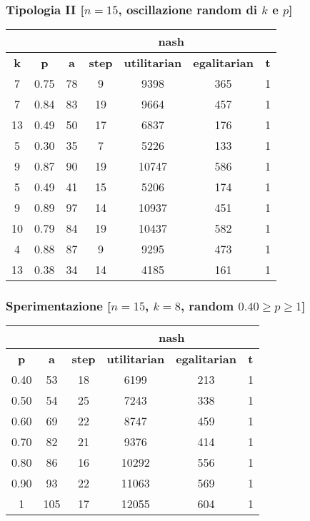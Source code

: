 \documentclass{beamer}
\begin{document}
\begin{frame}
\frametitle{Tipologia II [$n=15$, oscillazione random di $k$ e $p$]}
\begin{table}[H]
\centering
\scalebox{1} {
\begin{tabular}{|c|c|c|c|c|c|c|}
\hline
\multicolumn{3}{|c|}{\textbf{}} & \multicolumn{3}{c|}{\textbf{\color{orange}nash}} & \textbf{} \\ \hline
\textbf{\alert{k}} & \textbf{\alert{p}} & \textbf{a} & \textbf{step} & \textbf{utilitarian} & \textbf{egalitarian} & \textbf{t} \\ \hline
7 & 0.75 & 78 & 9 & 9398 & 365 & 1 \\ \hline
7 & 0.84 & 83 & 19 & 9664 & 457 & 1 \\ \hline
13 & 0.49 & 50 & 17 & 6837 & 176 & 1 \\ \hline
5 & 0.30 & 35 & 7 & 5226 & 133 & 1 \\ \hline
9 & 0.87 & 90 & 19 & 10747 & 586 & 1 \\ \hline
5 & 0.49 & 41 & 15 & 5206 & 174 & 1 \\ \hline
9 & 0.89 & 97 & 14 & 10937 & 451 & 1 \\ \hline
10 & 0.79 & 84 & 19 & 10437 & 582 & 1 \\ \hline
4 & 0.88 & 87 & 9 & 9295 & 473 & 1 \\ \hline
13 & 0.38 & 34 & 14 & 4185 & 161 & 1 \\ \hline
\end{tabular}
}
\end{table}
\end{frame}


\begin{frame}
\frametitle{Sperimentazione [$n=15$, $k=8$, random $0.40 \geq p \geq 1$]}
\begin{table}[H]
\centering
\scalebox{1} {
\begin{tabular}{|c|c|c|c|c|c|}
\hline
\multicolumn{3}{|c|}{\textbf{}} & \multicolumn{2}{c|}{\textbf{\color{orange}nash}} & \textbf{} \\ \hline
\textbf{\alert{p}} & \textbf{a} & \textbf{step} & \textbf{utilitarian} & \textbf{egalitarian} & \textbf{t} \\ \hline
0.40 & 53 & 18 & 6199 & 213 & 1 \\ \hline
0.50 & 54 & 25 & 7243 & 338 & 1 \\ \hline
0.60 & 69 & 22 & 8747 & 459 & 1 \\ \hline
0.70 & 82 & 21 & 9376 & 414 & 1 \\ \hline
0.80 & 86 & 16 & 10292 & 556 & 1 \\ \hline
0.90 & 93 & 22 & 11063 & 569 & 1 \\ \hline
1 & 105 & 17 & 12055 & 604 & 1 \\ \hline
\end{tabular}
}
\end{table}
\end{frame}
\end{document}
